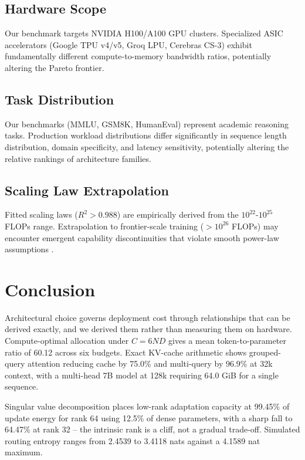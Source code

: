\documentclass[10pt,journal,compsoc,twocolumn]{IEEEtran}
\begin{document}
\subsection{Hardware Scope}


Our benchmark targets NVIDIA H100/A100 GPU clusters. Specialized ASIC accelerators (Google TPU v4/v5, Groq LPU, Cerebras CS-3) exhibit fundamentally different compute-to-memory bandwidth ratios, potentially altering the Pareto frontier.


\subsection{Task Distribution}


Our benchmarks (MMLU, GSM8K, HumanEval) represent academic reasoning tasks. Production workload distributions differ significantly in sequence length distribution, domain specificity, and latency sensitivity, potentially altering the relative rankings of architecture families.


\subsection{Scaling Law Extrapolation}


Fitted scaling laws ($R^2 > 0.988$) are empirically derived from the $10^{22}$-$10^{25}$ FLOPs range. Extrapolation to frontier-scale training ($>10^{26}$ FLOPs) may encounter emergent capability discontinuities that violate smooth power-law assumptions \cite{arxiv_2501_02497}.




\section{Conclusion}


Architectural choice governs deployment cost through relationships that can be derived exactly, and we derived them rather than measuring them on hardware. Compute-optimal allocation under $C = 6ND$ gives a mean token-to-parameter ratio of 60.12 across six budgets. Exact KV-cache arithmetic shows grouped-query attention reducing cache by 75.0\% and multi-query by 96.9\% at 32k context, with a multi-head 7B model at 128k requiring 64.0 GiB for a single sequence.

Singular value decomposition places low-rank adaptation capacity at 99.45\% of update energy for rank 64 using 12.5\% of dense parameters, with a sharp fall to 64.47\% at rank 32 -- the intrinsic rank is a cliff, not a gradual trade-off. Simulated routing entropy ranges from 2.4539 to 3.4118 nats against a 4.1589 nat maximum.
\end{document}
